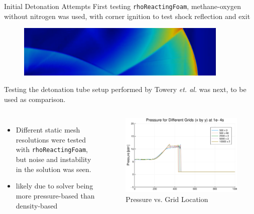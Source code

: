 \begin{frame}[allowframebreaks]{Initial Detonation Attempts}
First testing \texttt{rhoReactingFoam}, methane-oxygen without nitrogen was used, with corner ignition to test shock reflection and exit 
\begin{figure}[]
\centering
\includegraphics[width=0.9\textwidth]{../figs/cornerdet.png}
\end{figure}%
Testing the detonation tube setup performed by Towery \textit{et. al.} \cite{towery1} was next, to be used as comparison. 

\newpage

\begin{columns}
\begin{itemize}
\item Different static mesh resolutions were tested with \texttt{rhoReactingFoam}, but noise and instability in the solution was seen.
\item likely due to solver being more pressure-based than density-based
\end{itemize}
\begin{figure}[]
\centering
\includegraphics[width=\textwidth]{../figs/rhoReactingFoam.png}
\caption*{Pressure vs. Grid Location}
\end{figure}%
\end{columns}
\newpage


\end{frame}
